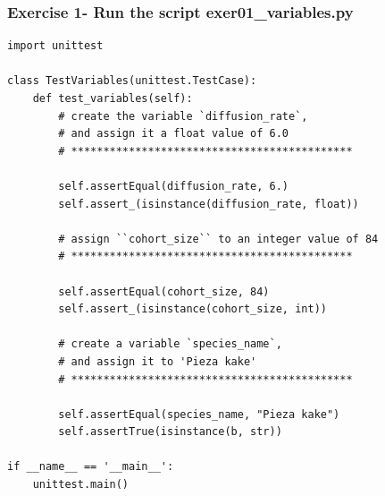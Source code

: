 \documentclass{beamer}
\newcommand\Fontix{\fontsize{9}{8.3}\selectfont}
\begin{document}
\begin{frame}[fragile]
\frametitle{Exercise 1- Run the script exer01\_variables.py}
\Fontix
\begin{lstlisting}
import unittest

class TestVariables(unittest.TestCase):
    def test_variables(self):
        # create the variable `diffusion_rate`, 
        # and assign it a float value of 6.0
        # ********************************************

        self.assertEqual(diffusion_rate, 6.)
        self.assert_(isinstance(diffusion_rate, float))

        # assign ``cohort_size`` to an integer value of 84
        # ********************************************
        
        self.assertEqual(cohort_size, 84)
        self.assert_(isinstance(cohort_size, int))

        # create a variable `species_name`,
        # and assign it to 'Pieza kake'
        # ********************************************

        self.assertEqual(species_name, "Pieza kake")
        self.assertTrue(isinstance(b, str))
        
if __name__ == '__main__':
    unittest.main()
\end{lstlisting}
\end{frame}






\end{document}
